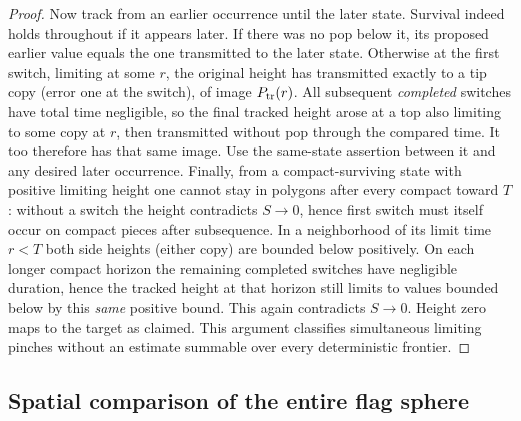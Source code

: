 \begin{proof}
Now track from an earlier occurrence until the later state.
Survival indeed holds throughout if it appears later.
If there was no pop below it, its proposed earlier value equals the one transmitted to the later state.
Otherwise at the first switch, limiting at some \(r\), the original height has transmitted exactly to a tip copy (error one at the switch), of image \(P_{\rm tr}(r)\).
All subsequent \emph{completed} switches have total time negligible, so the final tracked height arose at a top also limiting to some copy at \(r\), then transmitted without pop through the compared time.
It too therefore has that same image.
Use the same-state assertion between it and any desired later occurrence.
Finally, from a compact-surviving state with positive limiting height one cannot stay in polygons after every compact toward \(T\): without a switch the height contradicts \(S\to0\), hence first switch must itself occur on compact pieces after subsequence.
In a neighborhood of its limit time \(r<T\) both side heights (either copy) are bounded below positively.
On each longer compact horizon the remaining completed switches have negligible duration, hence the tracked height at that horizon still limits to values bounded below by this \emph{same} positive bound.
This again contradicts \(S\to0\).
Height zero maps to the target as claimed.
This argument classifies simultaneous limiting pinches without an estimate summable over every deterministic frontier.

\end{proof}

\subsection{Spatial comparison of the entire flag sphere}\label{cut:spatial-section}

